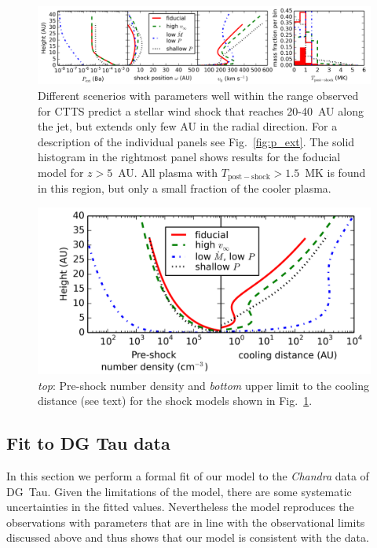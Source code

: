 \documentclass{emulateapj}
\begin{document}
\begin{figure}[h!]
\begin{center}
\includegraphics[width=1\columnwidth]{figures/result/result.png}
\caption{\label{fig:result}
Different scenerios with parameters well within the range observed for CTTS predict a stellar wind shock that reaches 20-40~AU along the jet, but extends only few AU in the radial direction. For a description of the individual panels see Fig.~\ref{fig:p_ext}. The solid histogram in the rightmost panel shows results for the foducial model for $z>5$~AU. All plasma with $T_{\mathrm{post-shock}}>1.5$~MK is found in this region, but only a small fraction of the cooler plasma.}
\end{center}
\end{figure}

\begin{figure}[h!]
\begin{center}
\includegraphics[width=0.42\columnwidth]{figures/rhocool/rhocool.png}
\caption{\label{fig:rhocool}
\emph{top}: Pre-shock number density and \emph{bottom} upper limit to the cooling distance (see text) for the shock models shown in Fig.~\ref{fig:result}.}
\end{center}
\end{figure}

\subsection{Fit to DG Tau data}
In this section we perform a formal fit of our model to the \emph{Chandra} data of DG~Tau. 
Given the limitations of the model, there are some systematic uncertainties in the fitted values. Nevertheless the model reproduces the observations with parameters that are in line with the observational limits discussed above and thus shows that our model is consistent with the data.
\end{document}
